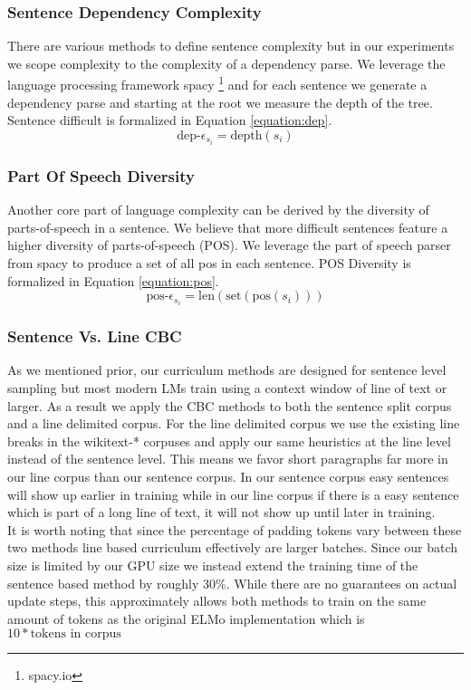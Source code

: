 \subsubsection{Sentence Dependency Complexity}
There are various methods to define sentence complexity but in our experiments we scope complexity to the complexity of a dependency parse. We leverage the language processing framework spacy \footnote{spacy.io} and for each sentence we generate a dependency parse and starting at the root we measure the depth of the tree. Sentence difficult is formalized in Equation \ref{equation:dep}.
\begin{equation}
    \text{dep-}\epsilon_{s_i} = \text{depth}(s_i)
    \label{equation:dep}
\end{equation}
\subsubsection{Part Of Speech Diversity}
Another core part of language complexity can be derived by the diversity of parts-of-speech in a sentence. We believe that more difficult sentences feature a higher diversity of parts-of-speech (POS). We leverage the part of speech parser from spacy to produce a set of all pos in each sentence. POS Diversity is formalized in Equation \ref{equation:pos}.
\begin{equation}
    \text{pos-}\epsilon_{s_i} = \text{len}(\text{set}(\text{pos}({s_i})))
    \label{equation:pos}
\end{equation}
\subsubsection{Sentence Vs. Line CBC}
As we mentioned prior, our curriculum methods are designed for sentence level sampling but most modern LMs train using a context window of line of text or larger. As a result we apply the CBC methods to both the sentence split corpus and a line delimited corpus. For the line delimited corpus we use the existing line breaks in the wikitext-* corpuses and apply our same heuristics at the line level instead of the sentence level. This means we favor short paragraphs far more in our line corpus than our sentence corpus. In our sentence corpus easy sentences will show up earlier in training while in our line corpus if there is a easy sentence which is part of a long line of text, it will not show up until later in training. \\
It is worth noting that since the percentage of padding tokens vary between these two methods line based curriculum effectively are larger batches. Since our batch size is limited by our GPU size we instead extend the training time of the sentence based method by roughly 30\%. While there are no guarantees on actual update steps, this approximately allows both methods to train on the same amount of tokens as the original ELMo implementation which is $10 * \text{tokens in corpus}$
